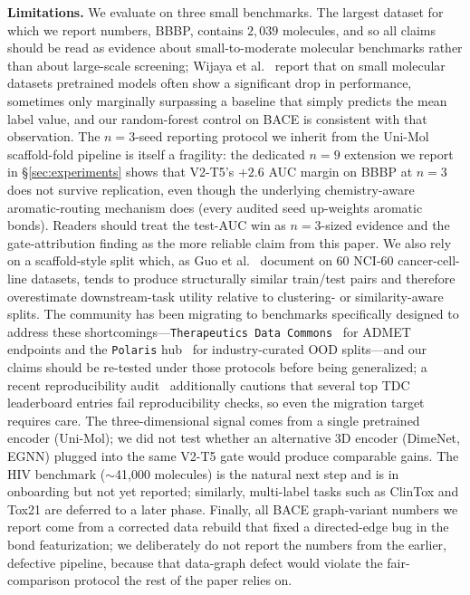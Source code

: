 \documentclass[conference]{IEEEtran}
\begin{document}
\noindent\textbf{Limitations.}
We evaluate on three small benchmarks. The largest dataset for which we report numbers, BBBP, contains $2{,}039$ molecules, and so all claims should be read as evidence about small-to-moderate molecular benchmarks rather than about large-scale screening; Wijaya et al.~\cite{wijaya2024twostage} report that on small molecular datasets pretrained models often show a significant drop in performance, sometimes only marginally surpassing a baseline that simply predicts the mean label value, and our random-forest control on BACE is consistent with that observation. The $n{=}3$-seed reporting protocol we inherit from the Uni-Mol scaffold-fold pipeline is itself a fragility: the dedicated $n{=}9$ extension we report in \S\ref{sec:experiments} shows that V2-T5's $+2.6$ AUC margin on BBBP at $n{=}3$ does not survive replication, even though the underlying chemistry-aware aromatic-routing mechanism does (every audited seed up-weights aromatic bonds). Readers should treat the test-AUC win as $n{=}3$-sized evidence and the gate-attribution finding as the more reliable claim from this paper. We also rely on a scaffold-style split which, as Guo et al.~\cite{guo2024scaffold} document on 60 NCI-60 cancer-cell-line datasets, tends to produce structurally similar train/test pairs and therefore overestimate downstream-task utility relative to clustering- or similarity-aware splits. The community has been migrating to benchmarks specifically designed to address these shortcomings---\texttt{Therapeutics Data Commons}~\cite{huang2021tdc} for ADMET endpoints and the \texttt{Polaris} hub~\cite{tossou2024polaris} for industry-curated OOD splits---and our claims should be re-tested under those protocols before being generalized; a recent reproducibility audit~\cite{tdcaudit2026} additionally cautions that several top TDC leaderboard entries fail reproducibility checks, so even the migration target requires care. The three-dimensional signal comes from a single pretrained encoder (Uni-Mol); we did not test whether an alternative 3D encoder (DimeNet, EGNN) plugged into the same V2-T5 gate would produce comparable gains. The HIV benchmark ($\sim$41{,}000 molecules) is the natural next step and is in onboarding but not yet reported; similarly, multi-label tasks such as ClinTox and Tox21 are deferred to a later phase. Finally, all BACE graph-variant numbers we report come from a corrected data rebuild that fixed a directed-edge bug in the bond featurization; we deliberately do not report the numbers from the earlier, defective pipeline, because that data-graph defect would violate the fair-comparison protocol the rest of the paper relies on.
\end{document}
